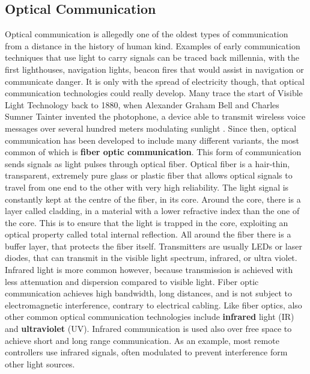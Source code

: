 \subsection{Optical Communication}
Optical communication is allegedly one of the oldest types of communication from a distance in the history of human kind.
Examples of early communication techniques that use light to carry signals can be traced back millennia, with the first lighthouses, navigation lights, beacon fires that would assist in navigation or communicate danger.
It is only with the spread of electricity though, that optical communication technologies could really develop.
Many trace the start of Visible Light Technology back to 1880, when Alexander Graham Bell and Charles Sumner Tainter invented the photophone, a device able to transmit wireless voice messages over several hundred meters modulating sunlight \cite{bell1880apparatus}.
Since then, optical communication has been developed to include many different variants, the most common of which is \textbf{fiber optic communication}. 
This form of communication sends signals as light pulses through optical fiber.
Optical fiber is a hair-thin, transparent, extremely pure glass or plastic fiber that allows optical signals to travel from one end to the other with very high reliability\cite{opticalfiber}.
The light signal is constantly kept at the centre of the fiber, in its core.
Around the core, there is a layer called cladding, in a material with a lower refractive index than the one of the core.
This is to ensure that the light is trapped in the core, exploiting an optical property called total internal reflection.
All around the fiber there is a buffer layer, that protects the fiber itself.
Transmitters are usually LEDs or laser diodes, that can transmit in the visible light spectrum, infrared, or ultra violet.
Infrared light is more common however, because transmission is achieved with less attenuation and dispersion compared to visible light.
Fiber optic communication achieves high bandwidth, long distances, and is not subject to electromagnetic interference, contrary to electrical cabling.
Like fiber optics, also other common optical communication technologies include \textbf{infrared} light (IR) and \textbf{ultraviolet} (UV).
Infrared communication is used also over free space to achieve short and long range communication.
As an example, most remote controllers use infrared signals, often modulated to prevent interference form other light sources.
 
